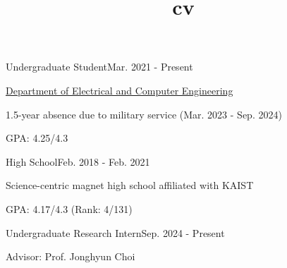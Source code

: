 \documentclass{cv}
\title{cv}
\begin{document}
\cvheader






{Undergraduate Student}{Mar. 2021 - Present}
{
    \item \href{http://ece.snu.ac.kr/en}{Department of Electrical and Computer Engineering}
    \item 1.5-year absence due to military service (Mar. 2023 - Sep. 2024)
    \item GPA: 4.25/4.3
}
{High School}{Feb. 2018 - Feb. 2021}
{
    \item Science-centric magnet high school affiliated with KAIST
    \item GPA: 4.17/4.3 (Rank: 4/131)
}



{Undergraduate Research Intern}{Sep. 2024 - Present}
{
    \item Advisor: Prof. Jonghyun Choi
}
\end{document}

